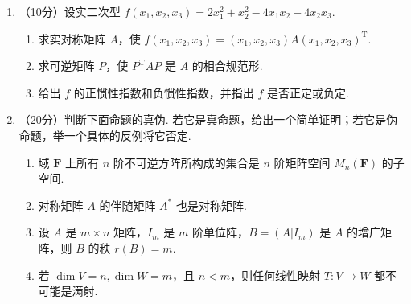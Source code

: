 \begin{enumerate}
\item （10分）设实二次型 $f(x_1,x_2,x_3) = 2x_1^2+x_2^2-4x_1x_2-4x_2x_3$.
    \begin{enumerate}
        \item 求实对称矩阵 $A$，使 $f(x_1,x_2,x_3)=(x_1,x_2,x_3)A(x_1,x_2,x_3)^{\mathrm{T}}$.

        \item 求可逆矩阵 $P$，使 $P^\mathrm{T}AP$ 是 $A$ 的相合规范形.

        \item 给出 $f$ 的正惯性指数和负惯性指数，并指出 $f$ 是否正定或负定.
    \end{enumerate}

\item （20分）判断下面命题的真伪. 若它是真命题，给出一个简单证明；若它是伪命题，举一个具体的反例将它否定.
    \begin{enumerate}
        \item 域 $\mathbf{F}$ 上所有 $n$ 阶不可逆方阵所构成的集合是 $n$ 阶矩阵空间 $M_n(\mathbf{F})$ 的子空间.

        \item 对称矩阵 $A$ 的伴随矩阵 $A^*$ 也是对称矩阵.

        \item 设 $A$ 是 $m\times n$ 矩阵，$I_m$ 是 $m$ 阶单位阵，$B=(A|I_m)$ 是 $A$ 的增广矩阵，则 $B$ 的秩 $r(B)=m$.

        \item 若 $\dim V = n,\dim W = m$，且 $n < m$，则任何线性映射 $T\colon V\to W$ 都不可能是满射.
    \end{enumerate}
\end{enumerate}

\clearpage
